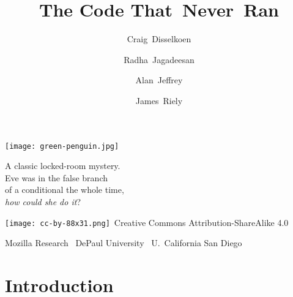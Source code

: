 \documentclass[aspectratio=169]{beamer}
\title{The Code That~Never~Ran}
\author{Craig~Disselkoen \and Radha~Jagadeesan \and Alan~Jeffrey \and James~Riely}
\begin{document}
\begin{frame}[plain]
  \texttt{[image: green-penguin.jpg]}
  \begin{minipage}[b][.9\textheight]{0.55\textwidth}\raggedleft
    A classic locked-room mystery.\\
    Eve was in the false branch\\
    of a conditional the whole time,\\
    \emph{how could she do it}?

    \vss

    \tiny
    \texttt{[image: cc-by-88x31.png]}~Creative Commons Attribution-ShareAlike 4.0

    Mozilla Research \textbar~DePaul University \textbar~U.~California San Diego
  \end{minipage}
\end{frame}

\section{Introduction}
\end{document}
